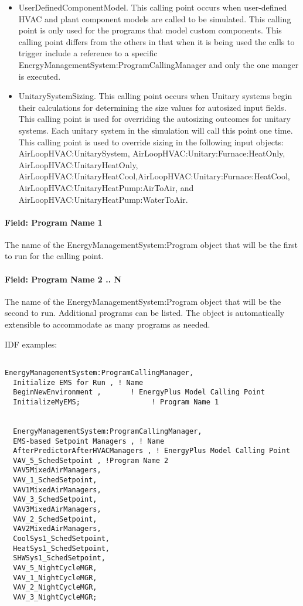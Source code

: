 \begin{itemize}
\item
  UserDefinedComponentModel. This calling point occurs when user-defined HVAC and plant component models are called to be simulated. This calling point is only used for the programs that model custom components. This calling point differs from the others in that when it is being used the calls to trigger include a reference to a specific EnergyManagementSystem:ProgramCallingManager and only the one manger is executed.
\item
  UnitarySystemSizing. This calling point occurs when Unitary systems begin their calculations for determining the size values for autosized input fields. This calling point is used for overriding the autosizing outcomes for unitary systems. Each unitary system in the simulation will call this point one time. This calling point is used to override sizing in the following input objects: AirLoopHVAC:UnitarySystem, AirLoopHVAC:Unitary:Furnace:HeatOnly, AirLoopHVAC:UnitaryHeatOnly, AirLoopHVAC:UnitaryHeatCool,AirLoopHVAC:Unitary:Furnace:HeatCool, AirLoopHVAC:UnitaryHeatPump:AirToAir, and AirLoopHVAC:UnitaryHeatPump:WaterToAir.
\end{itemize}

\paragraph{Field: Program Name 1}\label{field-program-name-1}

The name of the EnergyManagementSystem:Program object that will be the first to run for the calling point.

\paragraph{Field: Program Name 2 .. N}\label{field-program-name-2-..-n}

The name of the EnergyManagementSystem:Program object that will be the second to run. Additional programs can be listed. The object is automatically extensible to accommodate as many programs as needed.

IDF examples:

\begin{lstlisting}

EnergyManagementSystem:ProgramCallingManager,
  Initialize EMS for Run , ! Name
  BeginNewEnvironment ,       ! EnergyPlus Model Calling Point
  InitializeMyEMS;                 ! Program Name 1


  EnergyManagementSystem:ProgramCallingManager,
  EMS-based Setpoint Managers , ! Name
  AfterPredictorAfterHVACManagers , ! EnergyPlus Model Calling Point
  VAV_5_SchedSetpoint , !Program Name 2
  VAV5MixedAirManagers,
  VAV_1_SchedSetpoint,
  VAV1MixedAirManagers,
  VAV_3_SchedSetpoint,
  VAV3MixedAirManagers,
  VAV_2_SchedSetpoint,
  VAV2MixedAirManagers,
  CoolSys1_SchedSetpoint,
  HeatSys1_SchedSetpoint,
  SHWSys1_SchedSetpoint,
  VAV_5_NightCycleMGR,
  VAV_1_NightCycleMGR,
  VAV_2_NightCycleMGR,
  VAV_3_NightCycleMGR;
\end{lstlisting}

